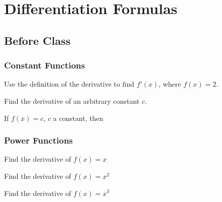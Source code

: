 \documentclass[notes]{subfiles}
\begin{document}
	\fancyhead[LO,RE]{\bfseries \currentname}
	\fancyfoot[C]{{}}
	\fancyfoot[RO,LE]{\large \thepage}	%

\section*{Differentiation Formulas}\label{cs23}
	\subsection*{Before Class}
	\subsubsection*{Constant Functions}
		\begin{ex}
			Use the definition of the derivative to find $f'(x)$, where $f(x) = 2$.
		\end{ex}
			
		\begin{ex}
			Find the derivative of an arbitrary constant $c$.
		\end{ex}
			
		\begin{thm}
			If $f(x) = c$, $c$ a constant, then 
		\end{thm}
			\newpage
	
	\subsubsection*{Power Functions}	
		\begin{ex}
			Find the derivative of $f(x) = x$
		\end{ex}
			
		\begin{ex}
			Find the derivative of $f(x) = x^2$
		\end{ex}
			
		\begin{ex}
			Find the derivative of $f(x) = x^3$
		\end{ex}
		
\end{document}
